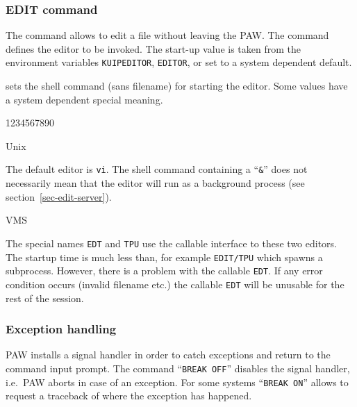 \subsubsection{EDIT command}

The  command allows to edit a file without leaving the
PAW.
The command  defines the editor to be invoked.
The start-up value is taken from the environment variables
\texttt{KUIPEDITOR}, \texttt{EDITOR}, or set to a system dependent default.

 sets the shell command (sans filename) for starting
the editor. 
Some values have a system dependent special meaning.


\begin{DL}{1234567890}
\item[Unix]

The default editor is \texttt{vi}.
The shell command containing a ``\texttt{\&}'' does not necessarily mean
that the editor will run as a background process 
(see section~\ref{sec-edit-server}). 

\item[VMS]

The special names \texttt{EDT} and \texttt{TPU} use the callable interface
to these two editors.
The startup time is much less than, for example \texttt{EDIT/TPU} which spawns a
subprocess.
However, there is a problem with the callable \texttt{EDT}.
If any error condition occurs (invalid filename etc.) the callable
\texttt{EDT} will be unusable for the rest of the session.

\end{DL}


\subsubsection{Exception handling}

PAW installs a signal handler in order to catch exceptions and return to
the command input prompt.
The command ``\texttt{BREAK OFF}'' disables the signal handler, i.e.\
PAW aborts in case of an exception.
For some systems ``\texttt{BREAK ON}'' allows to request a traceback of
where the exception has happened.

